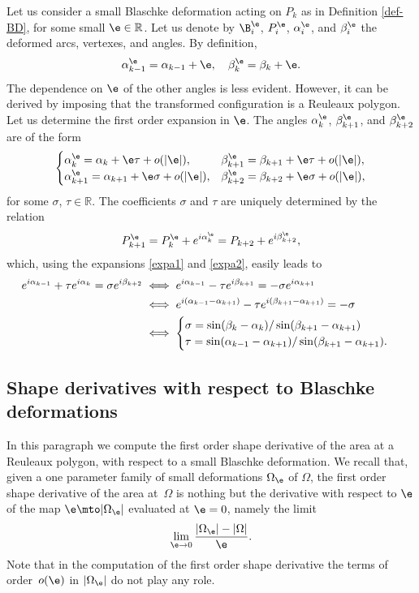 Let us consider a small Blaschke deformation acting on $P_k$ as in Definition \ref{def-BD}, for some small $\e\in \mathbb R$. Let us denote by $\B_i^\e$, $P_i^\e$, $\alpha_i^\e$, and $\beta_i^\e$ the deformed arcs, vertexes, and angles. By definition,
\begin{equation}\label{expa1}
\alpha_{k-1}^\e= \alpha_{k-1}+\e,\quad \beta_k^{\e} = \beta_k + \e.
\end{equation}
The dependence on $\e$ of the other angles is less evident. However, it can be derived by imposing that the transformed configuration is a Reuleaux polygon. Let us determine the first order expansion in $\e$. The angles $\alpha_k^\e$, $\beta_{k+1}^\e$, and $\beta_{k+2}^\e$ are of the form
\begin{equation}\label{expa2}
\begin{cases}
\alpha_k^\e = \alpha_k + \e \tau + {o(|\e|)}, & \beta_{k+1}^\e = \beta_{k+1} + \e \tau + o(|\e|),
\\
\alpha_{k+1}^\e = \alpha_{k+1} + \e \sigma + o(|\e|), & \beta_{k+2}^\e = \beta_{k+2} + \e \sigma + o(|\e|),
\end{cases}
\end{equation}
for some $\sigma$, $\tau\in \mathbb R$. The coefficients $\sigma$ and $\tau$ are uniquely determined by the relation
\[
P_{k+1}^\e = P_k^\e + e^{i \alpha_{k}^\e}=P_{k+2} + e^{i \beta_{k+2}^\e},
\]
which, using the expansions \eqref{expa1} and \eqref{expa2}, easily leads to
\begin{align}
e^{i \alpha_{k-1}} + \tau e^{i\alpha_k} = \sigma e^{i\beta_{k+2}}&\iff e^{i \alpha_{k-1}} - \tau e^{i\beta_{k+1}} = - \sigma e^{i\alpha_{k+1}} \notag
\\
& \iff e^{i (\alpha_{k-1} - \alpha_{k+1})} - \tau e^{i(\beta_{k+1} - \alpha_{k+1})}=-\sigma\notag
\\
& \iff
\begin{cases}\label{ab}
\sigma= \sin(\beta_k - \alpha_k) / \sin(\beta_{k+1} - \alpha_{k+1})\\ \tau= \sin(\alpha_{k-1} - \alpha_{k+1}) / \sin(\beta_{k+1} - \alpha_{k+1}).
\end{cases}
\end{align}

\subsection{Shape derivatives with respect to Blaschke deformations}
In this paragraph we compute the first order shape derivative of the area at a Reuleaux polygon, with respect to a small Blaschke deformation. We recall that, given a one parameter family of small deformations $\Omega_\e$ of $\Omega$, the first order shape derivative of the area at~$\Omega$ is nothing but the derivative with respect to $\e$ of the map
$
\e \mto |\Omega_\e|
$
evaluated at $\e=0$, namely the limit
\[
\lim_{\e \to 0} \frac{|\Omega_\e|-|\Omega|}{\e}.
\]
{Note that} in the computation of the first order shape derivative {the terms} of order~$o(\e)$ {in $|\Omega_\e|$} do not play any role.

